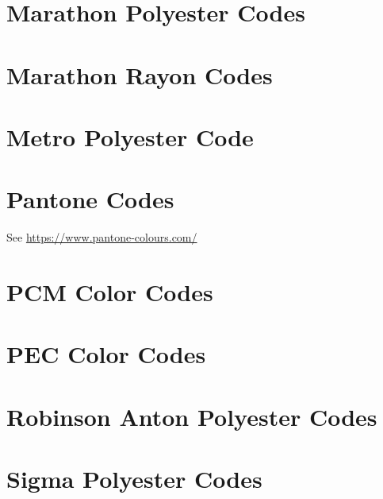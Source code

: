 \documentclass[a4paper]{report}
\begin{document}
%

\section{Marathon Polyester Codes}

%

\section{Marathon Rayon Codes}

%

\section{Metro Polyester Code}

%

\section{Pantone Codes}

See \url{https://www.pantone-colours.com/}

%

\section{PCM Color Codes}

%

\section{PEC Color Codes}

%

\section{Robinson Anton Polyester Codes}

% 

\section{Sigma Polyester Codes}

%
\end{document}
